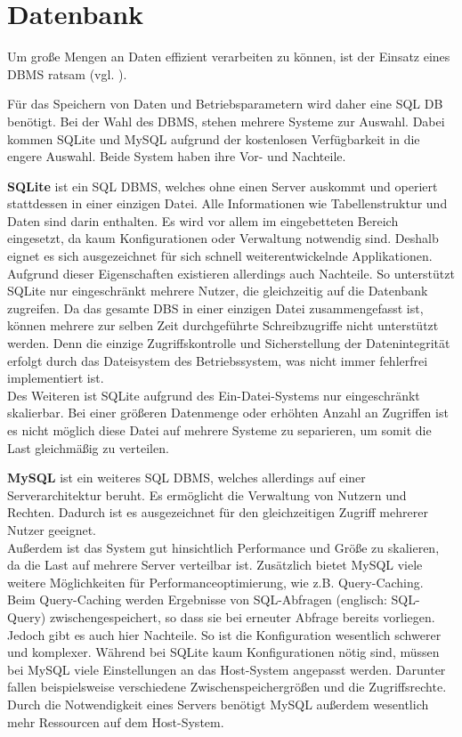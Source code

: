 \section{Datenbank}
\label{section_Datenbank}

Um große Mengen an Daten effizient verarbeiten zu können, ist der Einsatz eines \ac{DBMS} ratsam (vgl. \citep{saake2010datenbanken}).

Für das Speichern von Daten und Betriebsparametern wird daher eine \ac{SQL} \ac{DB} benötigt. Bei der Wahl des \ac{DBMS}, stehen mehrere Systeme zur Auswahl. Dabei kommen SQLite und MySQL aufgrund der kostenlosen Verfügbarkeit in die engere Auswahl.
Beide System haben ihre Vor- und Nachteile.


\textbf{SQLite} ist ein \ac{SQL} \ac{DBMS}, welches ohne einen Server auskommt und operiert stattdessen in einer einzigen Datei. Alle Informationen wie Tabellenstruktur und Daten sind darin enthalten. Es wird vor allem im eingebetteten Bereich eingesetzt, da kaum Konfigurationen oder Verwaltung notwendig sind. Deshalb eignet es sich ausgezeichnet für sich schnell weiterentwickelnde Applikationen.
\\
Aufgrund dieser Eigenschaften existieren allerdings auch Nachteile. So unterstützt SQLite nur eingeschränkt mehrere Nutzer, die gleichzeitig auf die Datenbank zugreifen. Da das gesamte \ac{DBS} in einer einzigen Datei zusammengefasst ist, können mehrere zur selben Zeit durchgeführte Schreibzugriffe nicht unterstützt werden. Denn die einzige Zugriffskontrolle und Sicherstellung der Datenintegrität erfolgt durch das Dateisystem des Betriebssystem, was nicht immer fehlerfrei implementiert ist.
\\
Des Weiteren ist SQLite aufgrund des Ein-Datei-Systems nur eingeschränkt skalierbar. Bei einer größeren Datenmenge oder erhöhten Anzahl an Zugriffen ist es nicht möglich diese Datei auf mehrere Systeme zu separieren, um somit die Last gleichmäßig zu verteilen.

\textbf{MySQL} ist ein weiteres \ac{SQL} \ac{DBMS}, welches allerdings auf einer Serverarchitektur beruht. 
Es ermöglicht die Verwaltung von Nutzern und Rechten. Dadurch ist es ausgezeichnet für den gleichzeitigen Zugriff mehrerer Nutzer geeignet.\\ Außerdem ist das System gut hinsichtlich Performance und Größe zu skalieren, da die Last auf mehrere Server verteilbar ist. Zusätzlich bietet MySQL viele weitere Möglichkeiten für Performanceoptimierung, wie z.B. Query-Caching. Beim Query-Caching werden Ergebnisse von SQL-Abfragen (englisch: SQL-Query) zwischengespeichert, so dass sie bei erneuter Abfrage bereits vorliegen.
\\
Jedoch gibt es auch hier Nachteile. So ist die Konfiguration wesentlich schwerer und komplexer. Während bei SQLite kaum Konfigurationen nötig sind, müssen bei MySQL viele Einstellungen an das Host-System angepasst werden. Darunter fallen beispielsweise verschiedene Zwischenspeichergrößen und die Zugriffsrechte. Durch die Notwendigkeit eines Servers benötigt MySQL außerdem wesentlich mehr Ressourcen auf dem Host-System.

